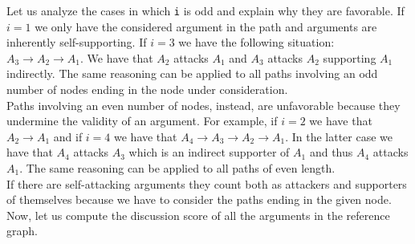 \documentclass{scrbook}
\begin{document}
Let us analyze the cases in which \texttt{i} is odd and explain why they are favorable. If $i=1$ we only have the considered argument in the path and arguments are inherently self-supporting. If $i=3$ we have the following situation: $A_3 \rightarrow A_2 \rightarrow A_1$. We have that $A_2$ attacks $A_1$ and $A_3$ attacks $A_2$ supporting $A_1$ indirectly. The same reasoning can be applied to all paths involving an odd number of nodes ending in the node under consideration. \\

Paths involving an even number of nodes, instead, are unfavorable because they undermine the validity of an argument. For example, if $i=2$ we have that $A_2 \rightarrow A_1$ and if $i=4$ we have that $A_4 \rightarrow A_3 \rightarrow A_2 \rightarrow A_1$. In the latter case we have that $A_4$ attacks $A_3$ which is an indirect supporter of $A_1$ and thus $A_4$ attacks $A_1$. The same reasoning can be applied to all paths of even length. \\

If there are self-attacking arguments they count both as attackers and supporters of themselves because we have to consider the paths ending in the given node. \\

Now, let us compute the discussion score of all the arguments in the reference graph.
\end{document}
